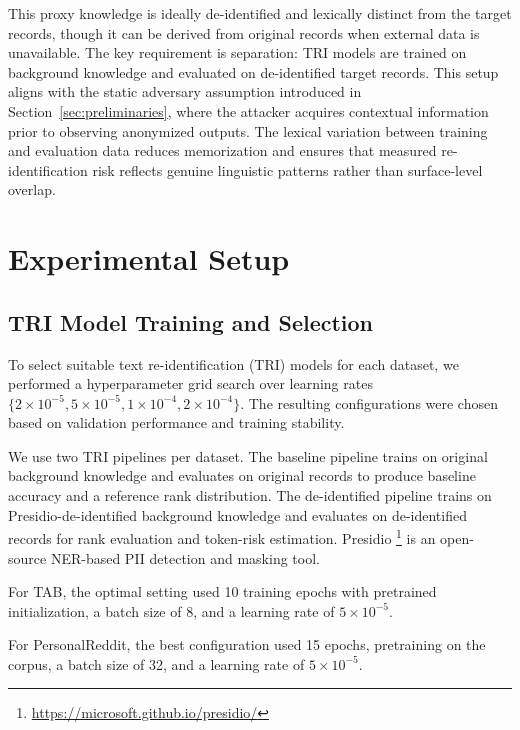\documentclass[10pt, a4paper]{article}
\begin{document}
This proxy knowledge is ideally de-identified and lexically distinct from the target records, though it can be derived from original records when external data is unavailable. The key requirement is separation: TRI models are trained on background knowledge and evaluated on de-identified target records. This setup aligns with the static adversary assumption introduced in Section~\ref{sec:preliminaries}, where the attacker acquires contextual information prior to observing anonymized outputs. The lexical variation between training and evaluation data reduces memorization and ensures that measured re-identification risk reflects genuine linguistic patterns rather than surface-level overlap.

\section{Experimental Setup}

\subsection{TRI Model Training and Selection}

To select suitable text re-identification (TRI) models for each dataset, we performed a hyperparameter grid search over learning rates $ \{ 2 \times 10^{-5}, 5 \times 10^{-5}, 1 \times 10^{-4}, 2 \times 10^{-4} \} $. The resulting configurations were chosen based on validation performance and training stability.

We use two TRI pipelines per dataset. The baseline pipeline trains on original background knowledge and evaluates on original records to produce baseline accuracy and a reference rank distribution. The de-identified pipeline trains on Presidio-de-identified background knowledge and evaluates on de-identified records for rank evaluation and token-risk estimation. Presidio \footnote{\url{https://microsoft.github.io/presidio/}} is an open-source NER-based PII detection and masking tool.

For TAB, the optimal setting used 10 training epochs with pretrained initialization, a batch size of 8, and a learning rate of $5 \times 10^{-5}$. 

For PersonalReddit, the best configuration used 15 epochs, pretraining on the corpus, a batch size of 32, and a learning rate of $5 \times 10^{-5}$.
\end{document}
